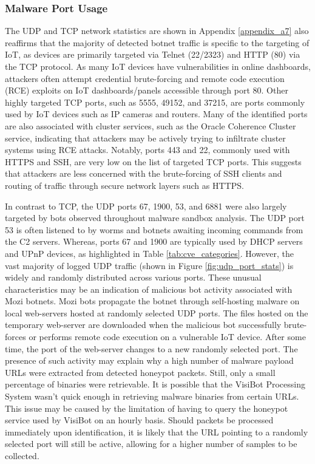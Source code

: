 \subsubsection{Malware Port Usage}

The UDP and TCP network statistics are shown in Appendix \ref{appendix_a7} also reaffirms that the majority of detected botnet traffic is specific to the targeting of IoT, as devices are primarily targeted via Telnet (22/2323) and HTTP (80) via the TCP protocol. As many IoT devices have vulnerabilities in online dashboards, attackers often attempt credential brute-forcing and remote code execution (RCE) exploits on IoT dashboards/panels accessible through port 80. Other highly targeted TCP ports, such as 5555, 49152, and 37215, are ports commonly used by IoT devices such as IP cameras and routers. Many of the identified ports are also associated with cluster services, such as the Oracle Coherence Cluster service, indicating that attackers may be actively trying to infiltrate cluster systems using RCE attacks. Notably, ports 443 and 22, commonly used with HTTPS and SSH, are very low on the list of targeted TCP ports. This suggests that attackers are less concerned with the brute-forcing of SSH clients and routing of traffic through secure network layers such as HTTPS.

In contrast to TCP, the UDP ports 67, 1900, 53, and 6881 were also largely targeted by bots observed throughout malware sandbox analysis. The UDP port 53 is often listened to by worms and botnets awaiting incoming commands from the C2 servers. \citep{SpeedguidePort53} Whereas, ports 67 and 1900 are typically used by DHCP servers and UPnP devices, as highlighted in Table \ref{tab:cve_categories}. However, the vast majority of logged UDP traffic (shown in Figure \ref{fig:udp_port_stats}) is widely and randomly distributed across various ports. These unusual characteristics may be an indication of malicious bot activity associated with Mozi botnets. Mozi bots propagate the botnet through self-hosting malware on local web-servers hosted at randomly selected UDP ports. The files hosted on the temporary web-server are downloaded when the malicious bot successfully brute-forces or performs remote code execution on a vulnerable IoT device. After some time, the port of the web-server changes to a new randomly selected port. The presence of such activity may explain why a high number of malware payload URLs were extracted from detected honeypot packets. Still, only a small percentage of binaries were retrievable. It is possible that the VisiBot Processing System wasn't quick enough in retrieving malware binaries from certain URLs. This issue may be caused by the limitation of having to query the honeypot service used by VisiBot on an hourly basis. Should packets be processed immediately upon identification, it is likely that the URL pointing to a randomly selected port will still be active, allowing for a higher number of samples to be collected.

